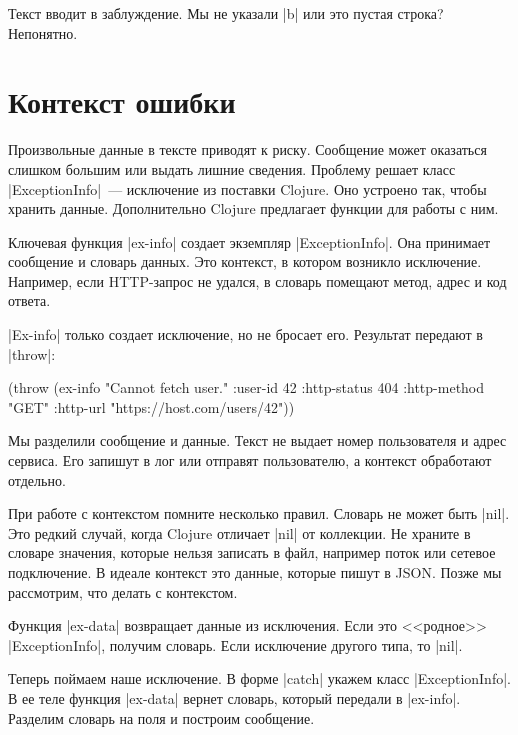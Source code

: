 \noindent
Текст вводит в заблуждение. Мы не указали \spverb|b| или это пустая строка?
Непонятно.

\section{Контекст ошибки}

Произвольные данные в тексте приводят к риску. Сообщение может оказаться слишком
большим или выдать лишние сведения. Проблему решает класс
\spverb|ExceptionInfo|~--- исключение из поставки Clojure. Оно устроено так,
чтобы хранить данные. Дополнительно Clojure предлагает функции для работы с ним.

Ключевая функция \spverb|ex-info| создает экземпляр \spverb|ExceptionInfo|. Она
принимает сообщение и словарь данных. Это контекст, в котором возникло
исключение. Например, если HTTP-запрос не удался, в словарь помещают метод,
адрес и код ответа.

\spverb|Ex-info| только создает исключение, но не бросает его. Результат
передают в \spverb|throw|:

\begin{english}
  \begin{clojure}
(throw (ex-info
        "Cannot fetch user."
        {:user-id 42
         :http-status 404
         :http-method "GET"
         :http-url "https://host.com/users/42"}))
  \end{clojure}
\end{english}

Мы разделили сообщение и данные. Текст не выдает номер пользователя и адрес
сервиса. Его запишут в лог или отправят пользователю, а контекст обработают
отдельно.

При работе с контекстом помните несколько правил. Словарь не может быть
\spverb|nil|. Это редкий случай, когда Clojure отличает \spverb|nil| от
коллекции. Не храните в словаре значения, которые нельзя записать в файл,
например поток или сетевое подключение. В идеале контекст это данные, которые
пишут в JSON. Позже мы рассмотрим, что делать с контекстом.

Функция \spverb|ex-data| возвращает данные из исключения. Если это <<родное>>
\spverb|ExceptionInfo|, получим словарь. Если исключение другого типа, то
\spverb|nil|.

Теперь поймаем наше исключение. В форме \spverb|catch| укажем класс
\spverb|ExceptionInfo|. В ее теле функция \spverb|ex-data| вернет словарь,
который передали в \spverb|ex-info|. Разделим словарь на поля и построим
сообщение.

